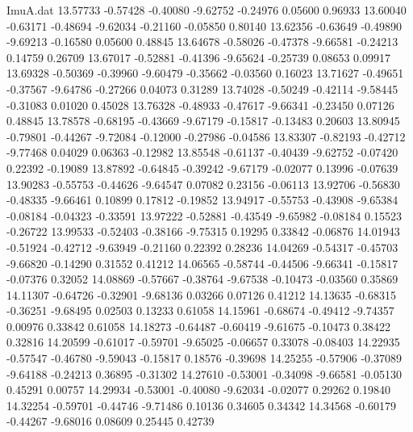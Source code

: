 \begin{filecontents}{ImuA.dat}
  13.57733   -0.57428   -0.40080   -9.62752   -0.24976    0.05600    0.96933
  13.60040   -0.63171   -0.48694   -9.62034   -0.21160   -0.05850    0.80140
  13.62356   -0.63649   -0.49890   -9.69213   -0.16580    0.05600    0.48845
  13.64678   -0.58026   -0.47378   -9.66581   -0.24213    0.14759    0.26709
  13.67017   -0.52881   -0.41396   -9.65624   -0.25739    0.08653    0.09917
  13.69328   -0.50369   -0.39960   -9.60479   -0.35662   -0.03560    0.16023
  13.71627   -0.49651   -0.37567   -9.64786   -0.27266    0.04073    0.31289
  13.74028   -0.50249   -0.42114   -9.58445   -0.31083    0.01020    0.45028
  13.76328   -0.48933   -0.47617   -9.66341   -0.23450    0.07126    0.48845
  13.78578   -0.68195   -0.43669   -9.67179   -0.15817   -0.13483    0.20603
  13.80945   -0.79801   -0.44267   -9.72084   -0.12000   -0.27986   -0.04586
  13.83307   -0.82193   -0.42712   -9.77468    0.04029    0.06363   -0.12982
  13.85548   -0.61137   -0.40439   -9.62752   -0.07420    0.22392   -0.19089
  13.87892   -0.64845   -0.39242   -9.67179   -0.02077    0.13996   -0.07639
  13.90283   -0.55753   -0.44626   -9.64547    0.07082    0.23156   -0.06113
  13.92706   -0.56830   -0.48335   -9.66461    0.10899    0.17812   -0.19852
  13.94917   -0.55753   -0.43908   -9.65384   -0.08184   -0.04323   -0.33591
  13.97222   -0.52881   -0.43549   -9.65982   -0.08184    0.15523   -0.26722
  13.99533   -0.52403   -0.38166   -9.75315    0.19295    0.33842   -0.06876
  14.01943   -0.51924   -0.42712   -9.63949   -0.21160    0.22392    0.28236
  14.04269   -0.54317   -0.45703   -9.66820   -0.14290    0.31552    0.41212
  14.06565   -0.58744   -0.44506   -9.66341   -0.15817   -0.07376    0.32052
  14.08869   -0.57667   -0.38764   -9.67538   -0.10473   -0.03560    0.35869
  14.11307   -0.64726   -0.32901   -9.68136    0.03266    0.07126    0.41212
  14.13635   -0.68315   -0.36251   -9.68495    0.02503    0.13233    0.61058
  14.15961   -0.68674   -0.49412   -9.74357    0.00976    0.33842    0.61058
  14.18273   -0.64487   -0.60419   -9.61675   -0.10473    0.38422    0.32816
  14.20599   -0.61017   -0.59701   -9.65025   -0.06657    0.33078   -0.08403
  14.22935   -0.57547   -0.46780   -9.59043   -0.15817    0.18576   -0.39698
  14.25255   -0.57906   -0.37089   -9.64188   -0.24213    0.36895   -0.31302
  14.27610   -0.53001   -0.34098   -9.66581   -0.05130    0.45291    0.00757
  14.29934   -0.53001   -0.40080   -9.62034   -0.02077    0.29262    0.19840
  14.32254   -0.59701   -0.44746   -9.71486    0.10136    0.34605    0.34342
  14.34568   -0.60179   -0.44267   -9.68016    0.08609    0.25445    0.42739

\end{filecontents}
